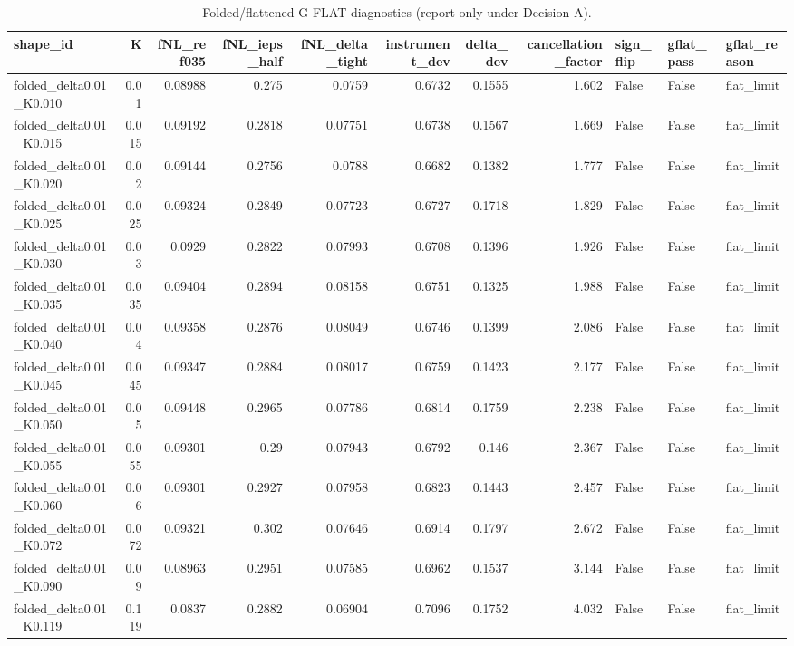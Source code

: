 \begin{table}[htbp]
\centering
\caption{Folded/flattened G-FLAT diagnostics (report-only under Decision A).}
\label{tab:gflat}
\begin{tabular}{lrrrrrrrlll}
\hline
shape\_id & K & fNL\_ref035 & fNL\_ieps\_half & fNL\_delta\_tight & instrument\_dev & delta\_dev & cancellation\_factor & sign\_flip & gflat\_pass & gflat\_reason \\
\hline
folded\_delta0.01\_K0.010 & 0.01 & 0.08988 & 0.275 & 0.0759 & 0.6732 & 0.1555 & 1.602 & False & False & flat\_limit \\
folded\_delta0.01\_K0.015 & 0.015 & 0.09192 & 0.2818 & 0.07751 & 0.6738 & 0.1567 & 1.669 & False & False & flat\_limit \\
folded\_delta0.01\_K0.020 & 0.02 & 0.09144 & 0.2756 & 0.0788 & 0.6682 & 0.1382 & 1.777 & False & False & flat\_limit \\
folded\_delta0.01\_K0.025 & 0.025 & 0.09324 & 0.2849 & 0.07723 & 0.6727 & 0.1718 & 1.829 & False & False & flat\_limit \\
folded\_delta0.01\_K0.030 & 0.03 & 0.0929 & 0.2822 & 0.07993 & 0.6708 & 0.1396 & 1.926 & False & False & flat\_limit \\
folded\_delta0.01\_K0.035 & 0.035 & 0.09404 & 0.2894 & 0.08158 & 0.6751 & 0.1325 & 1.988 & False & False & flat\_limit \\
folded\_delta0.01\_K0.040 & 0.04 & 0.09358 & 0.2876 & 0.08049 & 0.6746 & 0.1399 & 2.086 & False & False & flat\_limit \\
folded\_delta0.01\_K0.045 & 0.045 & 0.09347 & 0.2884 & 0.08017 & 0.6759 & 0.1423 & 2.177 & False & False & flat\_limit \\
folded\_delta0.01\_K0.050 & 0.05 & 0.09448 & 0.2965 & 0.07786 & 0.6814 & 0.1759 & 2.238 & False & False & flat\_limit \\
folded\_delta0.01\_K0.055 & 0.055 & 0.09301 & 0.29 & 0.07943 & 0.6792 & 0.146 & 2.367 & False & False & flat\_limit \\
folded\_delta0.01\_K0.060 & 0.06 & 0.09301 & 0.2927 & 0.07958 & 0.6823 & 0.1443 & 2.457 & False & False & flat\_limit \\
folded\_delta0.01\_K0.072 & 0.072 & 0.09321 & 0.302 & 0.07646 & 0.6914 & 0.1797 & 2.672 & False & False & flat\_limit \\
folded\_delta0.01\_K0.090 & 0.09 & 0.08963 & 0.2951 & 0.07585 & 0.6962 & 0.1537 & 3.144 & False & False & flat\_limit \\
folded\_delta0.01\_K0.119 & 0.119 & 0.0837 & 0.2882 & 0.06904 & 0.7096 & 0.1752 & 4.032 & False & False & flat\_limit \\
\hline
\end{tabular}
\end{table}
